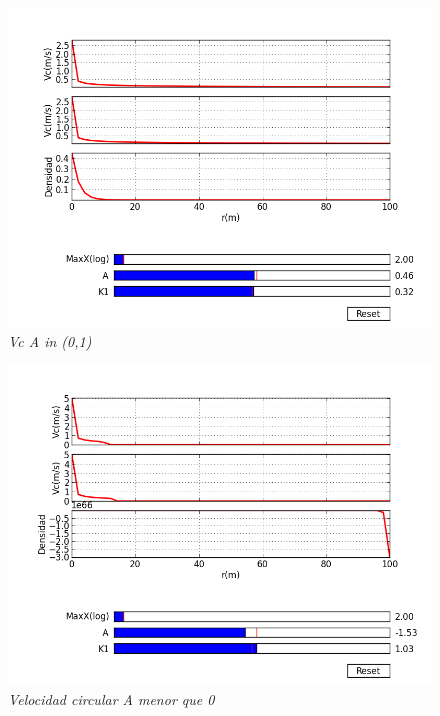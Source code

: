 \documentclass[12pt]{book}
\begin{document}
\begin{figure}[!h]
 \centering
 \includegraphics[scale=0.7]{velocity2.png}
 \caption{\emph{Vc A in (0,1) }}
 \label{Fig: 1}
\end{figure}

\begin{figure}[!h]
 \centering
 \includegraphics[scale=0.7]{velocity3.png}
 \caption{\emph{Velocidad circular A menor que 0}}
 \label{Fig: 1}
\end{figure}
\end{document}
